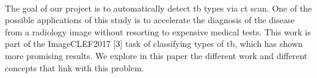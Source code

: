 \paragraph{}
The goal of our project is to automatically detect \ac{tb} types via \ac{ct} scan. One of the possible applications of this study is to accelerate the diagnosis of the disease from a radiology image without resorting to expensive medical tests. This work is part of the ImageCLEF2017 [3] task of classifying types of \ac{tb}, which has shown more promising results. We explore in this paper the different work and different concepts that link with this problem.